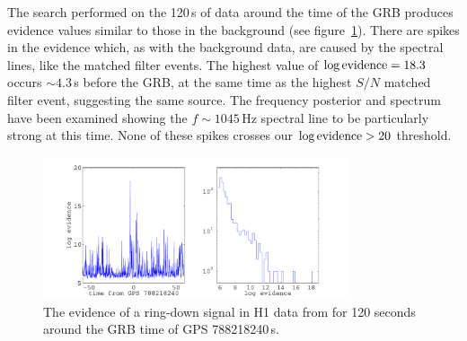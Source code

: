 The search performed on the 120\,s of data around the time of the GRB produces evidence values
similar to those in the background (see figure~\ref{H1EvidenceOnsource}). There are spikes in the
evidence which, as with the background data, are caused by the spectral lines, like the matched
filter events. The highest value of $\log{\rm evidence} = 18.3$ occurs $\sim 4.3$\,s before the
GRB, at the same time as the highest $S/N$ matched filter event, suggesting the same source. The
frequency posterior and spectrum have been examined showing the $f \sim 1045$\,Hz spectral line to
be particularly strong at this time. None of these spikes crosses our $\log{\rm evidence} > 20$
threshold.
\begin{figure}[!htbp]
\begin{center}
\includegraphics[width=0.8\textwidth]{figs/H1EvidenceOnsource}\caption{The evidence
of a ring-down signal in H1 data from for 120 seconds around the GRB time of GPS
788218240\,s.}\label{H1EvidenceOnsource}
\end{center}
\end{figure}

